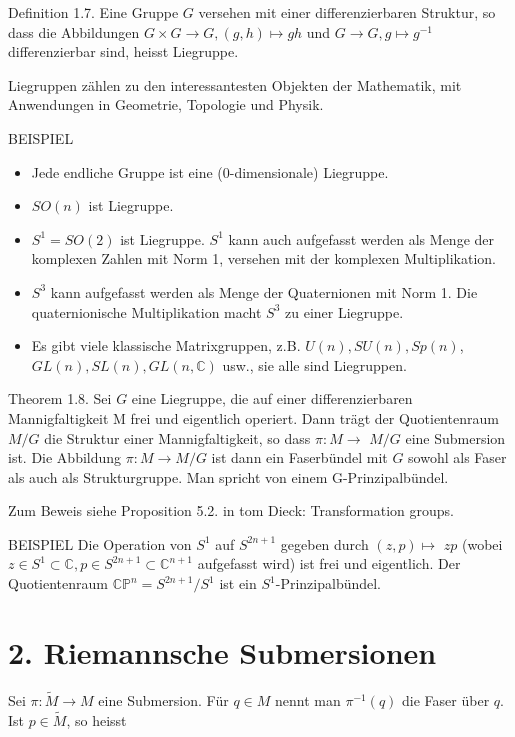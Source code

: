 \documentclass[10pt]{article}
\begin{document}
Definition 1.7. Eine Gruppe $G$ versehen mit einer differenzierbaren Struktur, so dass die Abbildungen $G \times G \rightarrow G,(g, h) \mapsto g h$ und $G \rightarrow G, g \mapsto g^{-1}$ differenzierbar sind, heisst Liegruppe.

Liegruppen zählen zu den interessantesten Objekten der Mathematik, mit Anwendungen in Geometrie, Topologie und Physik.

BEISPIEL

\begin{itemize}
  \item Jede endliche Gruppe ist eine (0-dimensionale) Liegruppe.
  \item $S O(n)$ ist Liegruppe.
  \item $S^{1}=S O(2)$ ist Liegruppe. $S^{1}$ kann auch aufgefasst werden als Menge der komplexen Zahlen mit Norm 1, versehen mit der komplexen Multiplikation.
  \item $S^{3}$ kann aufgefasst werden als Menge der Quaternionen mit Norm 1. Die quaternionische Multiplikation macht $S^{3}$ zu einer Liegruppe.
  \item Es gibt viele klassische Matrixgruppen, z.B. $U(n), S U(n), S p(n)$, $G L(n), S L(n), G L(n, \mathbb{C})$ usw., sie alle sind Liegruppen.
\end{itemize}

Theorem 1.8. Sei $G$ eine Liegruppe, die auf einer differenzierbaren Mannigfaltigkeit M frei und eigentlich operiert. Dann trägt der Quotientenraum $M / G$ die Struktur einer Mannigfaltigkeit, so dass $\pi: M \rightarrow$ $M / G$ eine Submersion ist. Die Abbildung $\pi: M \rightarrow M / G$ ist dann ein Faserbündel mit $G$ sowohl als Faser als auch als Strukturgruppe. Man spricht von einem G-Prinzipalbündel.

Zum Beweis siehe Proposition 5.2. in tom Dieck: Transformation groups.

BEISPIEL Die Operation von $S^{1}$ auf $S^{2 n+1}$ gegeben durch $(z, p) \mapsto$ $z p$ (wobei $z \in S^{1} \subset \mathbb{C}, p \in S^{2 n+1} \subset \mathbb{C}^{n+1}$ aufgefasst wird) ist frei und eigentlich. Der Quotientenraum $\mathbb{C P}^{n}=S^{2 n+1} / S^{1}$ ist ein $S^{1}$-Prinzipalbündel.

\section*{2. Riemannsche Submersionen}
Sei $\pi: \tilde{M} \rightarrow M$ eine Submersion. Für $q \in M$ nennt man $\pi^{-1}(q)$ die Faser über $q$. Ist $p \in \tilde{M}$, so heisst
\end{document}
